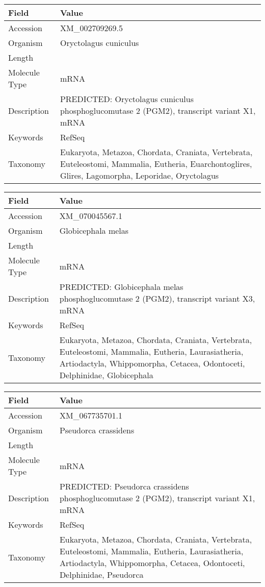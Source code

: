 \documentclass[10pt]{article}
\begin{document}
{\footnotesize
\begin{longtable}{>{\raggedright\arraybackslash}p{4.5cm} >{\raggedright\arraybackslash}p{11.5cm}}
\textbf{Field} & \textbf{Value} \\
\hline
Accession & XM\_002709269.5 \\
Organism & Oryctolagus cuniculus \\
Length & 3759 \\
Molecule Type & mRNA \\
Description & PREDICTED: Oryctolagus cuniculus phosphoglucomutase 2 (PGM2), transcript variant X1, mRNA \\
Keywords & RefSeq \\
Taxonomy & Eukaryota, Metazoa, Chordata, Craniata, Vertebrata, Euteleostomi, Mammalia, Eutheria, Euarchontoglires, Glires, Lagomorpha, Leporidae, Oryctolagus \\
\end{longtable}
}

{\footnotesize
\begin{longtable}{>{\raggedright\arraybackslash}p{4.5cm} >{\raggedright\arraybackslash}p{11.5cm}}
\textbf{Field} & \textbf{Value} \\
\hline
Accession & XM\_070045567.1 \\
Organism & Globicephala melas \\
Length & 6752 \\
Molecule Type & mRNA \\
Description & PREDICTED: Globicephala melas phosphoglucomutase 2 (PGM2), transcript variant X3, mRNA \\
Keywords & RefSeq \\
Taxonomy & Eukaryota, Metazoa, Chordata, Craniata, Vertebrata, Euteleostomi, Mammalia, Eutheria, Laurasiatheria, Artiodactyla, Whippomorpha, Cetacea, Odontoceti, Delphinidae, Globicephala \\
\end{longtable}
}

{\footnotesize
\begin{longtable}{>{\raggedright\arraybackslash}p{4.5cm} >{\raggedright\arraybackslash}p{11.5cm}}
\textbf{Field} & \textbf{Value} \\
\hline
Accession & XM\_067735701.1 \\
Organism & Pseudorca crassidens \\
Length & 12693 \\
Molecule Type & mRNA \\
Description & PREDICTED: Pseudorca crassidens phosphoglucomutase 2 (PGM2), transcript variant X1, mRNA \\
Keywords & RefSeq \\
Taxonomy & Eukaryota, Metazoa, Chordata, Craniata, Vertebrata, Euteleostomi, Mammalia, Eutheria, Laurasiatheria, Artiodactyla, Whippomorpha, Cetacea, Odontoceti, Delphinidae, Pseudorca \\
\end{longtable}
}
\end{document}
